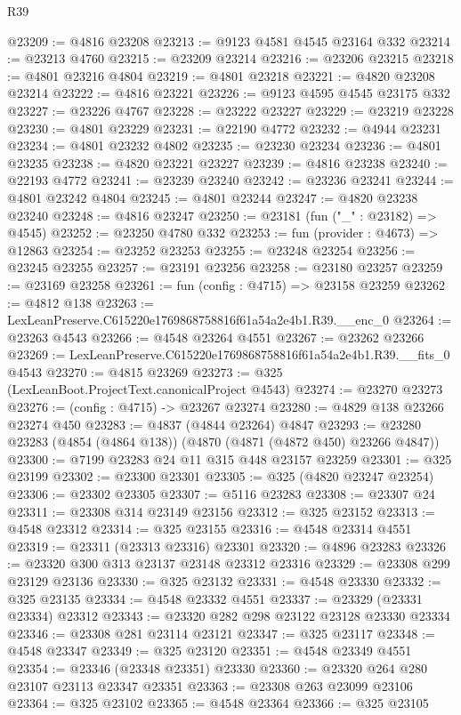 \begin{lexlean}{R39}
\begin{coremodule}
@23209 := @4816 @23208
@23213 := @9123 @4581 @4545 @23164 @332
@23214 := @23213 @4760
@23215 := @23209 @23214
@23216 := @23206 @23215
@23218 := @4801 @23216 @4804
@23219 := @4801 @23218
@23221 := @4820 @23208 @23214
@23222 := @4816 @23221
@23226 := @9123 @4595 @4545 @23175 @332
@23227 := @23226 @4767
@23228 := @23222 @23227
@23229 := @23219 @23228
@23230 := @4801 @23229
@23231 := @22190 @4772
@23232 := @4944 @23231
@23234 := @4801 @23232 @4802
@23235 := @23230 @23234
@23236 := @4801 @23235
@23238 := @4820 @23221 @23227
@23239 := @4816 @23238
@23240 := @22193 @4772
@23241 := @23239 @23240
@23242 := @23236 @23241
@23244 := @4801 @23242 @4804
@23245 := @4801 @23244
@23247 := @4820 @23238 @23240
@23248 := @4816 @23247
@23250 := @23181 (fun ("_" : @23182) => @4545)
@23252 := @23250 @4780 @332
@23253 := fun (provider : @4673) => @12863
@23254 := @23252 @23253
@23255 := @23248 @23254
@23256 := @23245 @23255
@23257 := @23191 @23256
@23258 := @23180 @23257
@23259 := @23169 @23258
@23261 := fun (config : @4715) => @23158 @23259
@23262 := @4812 @138
@23263 := LexLeanPreserve.C615220e1769868758816f61a54a2e4b1.R39.__enc_0
@23264 := @23263 @4543
@23266 := @4548 @23264 @4551
@23267 := @23262 @23266
@23269 := LexLeanPreserve.C615220e1769868758816f61a54a2e4b1.R39.__fits_0 @4543
@23270 := @4815 @23269
@23273 := @325 (LexLeanBoot.ProjectText.canonicalProject @4543)
@23274 := @23270 @23273
@23276 := (config : @4715) -> @23267 @23274
@23280 := @4829 @138 @23266 @23274 @450
@23283 := @4837 (@4844 @23264) @4847
@23293 := @23280 @23283 (@4854 (@4864 @138)) (@4870 (@4871 (@4872 @450) @23266 @4847))
@23300 := @7199 @23283 @24 @11 @315 @448 @23157 @23259
@23301 := @325 @23199
@23302 := @23300 @23301
@23305 := @325 (@4820 @23247 @23254)
@23306 := @23302 @23305
@23307 := @5116 @23283
@23308 := @23307 @24
@23311 := @23308 @314 @23149 @23156
@23312 := @325 @23152
@23313 := @4548 @23312
@23314 := @325 @23155
@23316 := @4548 @23314 @4551
@23319 := @23311 (@23313 @23316) @23301
@23320 := @4896 @23283
@23326 := @23320 @300 @313 @23137 @23148 @23312 @23316
@23329 := @23308 @299 @23129 @23136
@23330 := @325 @23132
@23331 := @4548 @23330
@23332 := @325 @23135
@23334 := @4548 @23332 @4551
@23337 := @23329 (@23331 @23334) @23312
@23343 := @23320 @282 @298 @23122 @23128 @23330 @23334
@23346 := @23308 @281 @23114 @23121
@23347 := @325 @23117
@23348 := @4548 @23347
@23349 := @325 @23120
@23351 := @4548 @23349 @4551
@23354 := @23346 (@23348 @23351) @23330
@23360 := @23320 @264 @280 @23107 @23113 @23347 @23351
@23363 := @23308 @263 @23099 @23106
@23364 := @325 @23102
@23365 := @4548 @23364
@23366 := @325 @23105

\end{coremodule}
\end{lexlean}
